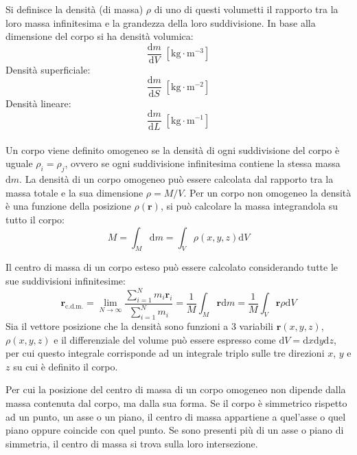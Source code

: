 \documentclass{article}
\newcommand{\vect}[1]{\boldsymbol{\mathbf{#1}}}
\newcommand{\df}{\mathrm{d}}
\numberwithin{equation}{subsection}
\begin{document}
Si definisce la densità (di massa) $\rho$ di uno 
di questi volumetti il rapporto tra la loro massa infinitesima e la 
grandezza della loro suddivisione. In base alla dimensione 
del corpo si ha densità volumica:
\begin{equation*}
    \displaystyle\frac{\df m}{\df V}\;\left[\mathrm{kg}\cdot\mathrm{m}^{-3}\right]
\end{equation*}
Densità superficiale: 
\begin{equation*}
    \displaystyle\frac{\df m}{\df S}\;\left[\mathrm{kg}\cdot\mathrm{m}^{-2}\right]
\end{equation*}
Densità lineare:
\begin{equation*}
    \displaystyle\frac{\df m}{\df L}\;\left[\mathrm{kg}\cdot\mathrm{m}^{-1}\right]
\end{equation*}
\\
Un corpo viene definito omogeneo se la densità di ogni 
suddivisione del corpo è uguale $\rho_i=\rho_j$, ovvero se ogni suddivisione infinitesima contiene la stessa massa $\df m$. 
La densità di un corpo omogeneo può essere calcolata dal rapporto 
tra la massa totale e la sua dimensione $\rho={M}/{V}$. 
Per un corpo non omogeneo la densità è una funzione della posizione $\rho(\vect{r})$, si può calcolare la massa integrandola su tutto il corpo: 
\begin{equation}
    M=\displaystyle\int_M \df m=\int_V \rho(x,y,z) \df V 
\end{equation}


Il centro di massa di un corpo esteso può essere calcolato considerando tutte le sue suddivisioni infinitesime: 
\begin{equation}
    \vect{r}_{\mathrm{c.d.m.}}=\lim_{N\to\infty}\displaystyle\frac{\sum_{i=1}^{N}m_i\vect{r}_i}{\sum_{i=1}^{N}m_i}=\displaystyle\frac{1}{M}\int_M\vect{r}\df m=\displaystyle\frac{1}{M}\int_V\vect{r}\rho \df V
\end{equation}
Sia il vettore posizione che la densità sono funzioni a $3$ variabili $\vect{r}(x,y,z)$, $\rho(x,y,z)$ e il differenziale del volume può essere espresso come $\df V=\df x\df y\df z$, per cui questo integrale corrisponde 
ad un integrale triplo sulle tre direzioni $x$, $y$ e $z$ su cui è definito il corpo. 


Per cui la posizione del centro di massa di un corpo omogeneo non dipende dalla massa contenuta dal corpo, ma dalla sua forma. Se il corpo è simmetrico rispetto ad un punto, un 
asse o un piano, il centro di massa appartiene a quel'asse o quel piano oppure coincide con quel punto. Se sono presenti più di un asse o piano di simmetria, il centro di massa 
si trova sulla loro intersezione. 
\end{document}
